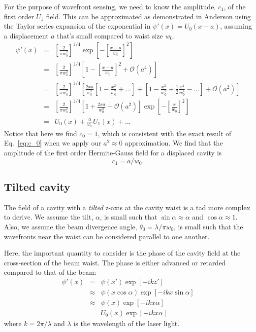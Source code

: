 For the purpose of wavefront sensing, we need to know the amplitude,
$c_1$, of the first order $U_1$ field. This can be approximated as
demonstrated in Anderson \cite{Anderson1984Alignment} using
the Taylor series expansion of the exponential in $\psi \prime(x) =
U_0(x-a)$, assuming a displacement $a$ that's small compared to waist
size $w_0$.
\begin{eqnarray}
\psi \prime(x) &=& \left[ \frac{2}{\pi w_0^2} \right]^{1/4}
\exp{\left[-\left[\frac{x-a}{w_0}\right]^2\right]} \\
&=& \left[ \frac{2}{\pi w_0^2} \right]^{1/4} \left[1 -
  \left[\frac{x-a}{w_0} \right]^2 + \mathcal{O}(a^4) \right] \\
&=& \left[ \frac{2}{\pi w_0^2} \right]^{1/4} \left[ \frac{2xa}{w_0^2}
  \left[1-\frac{x^2}{w_0^2} + ... \right] + \left[ 1 -
    \frac{x^2}{w_0^2} + \frac{1}{2} \frac{x^4}{w_0^4}
    - ... \right] + \mathcal{O}(a^2) \right] \\
&=& \left[ \frac{2}{\pi w_0^2} \right]^{1/4} \left[1 +
  \frac{2xa}{w_0^2} + \mathcal{O}(a^2) \right] \exp{\left[ -\left[\frac{x}{w_0}\right]^2
  \right]} \\
&=& U_0(x) + \frac{a}{w_0} U_1(x) + ...
\end{eqnarray}
Notice that here we find $c_0 = 1$, which is consistent with the
exact result of Eq.~\ref{eq:c_0} when we apply our $a^2 \approx 0$
approximation. We find that the amplitude of the first order
Hermite-Gauss field for a displaced cavity is
\begin{equation}c_1 = a/w_0.
\end{equation}



\subsection{Tilted cavity}
The field of a cavity with a \emph{tilted} z-axis at the cavity waist is a tad more complex to derive. We assume the tilt, $\alpha$, is small such that $\sin{\alpha} \approx \alpha$ and $\cos{\alpha} \approx 1$. Also, we assume the beam divergence angle, $\theta_0=\lambda / \pi w_0$, is small such that the wavefronts near the waist can be considered parallel to one another. 

Here, the important quantity to consider is the phase of the cavity field at the cross-section of the beam waist.  The phase is either advanced or retarded compared to that of the beam:
\begin{eqnarray}
\psi \prime(x) &=& \psi(x \prime) \exp{[-i k z \prime]} \\
 & \approx& \psi(x \cos{\alpha}) \exp{[-i k x \sin{\alpha}]} \\
 &\approx& \psi(x) \exp{[- i k x \alpha]} \\
 &=& U_0(x) \exp{[- i k x \alpha]}
\label{eq:psi_tilted}
\end{eqnarray}
where $k=2\pi / \lambda$ and $\lambda$ is the wavelength of the laser light.

